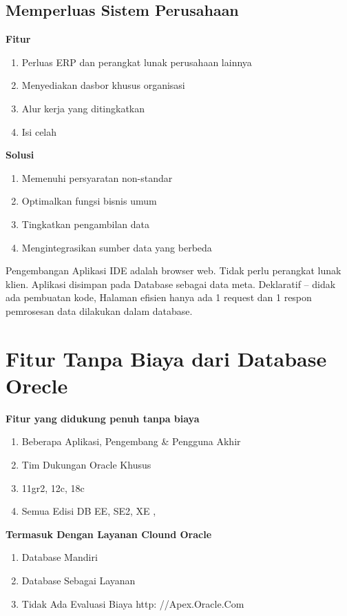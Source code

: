 \documentclass{article}
\begin{document}
\subsection{Memperluas Sistem Perusahaan}
\textbf{Fitur}
\begin{enumerate}
    \item  Perluas ERP dan perangkat lunak perusahaan lainnya
    \item Menyediakan dasbor khusus organisasi
    \item Alur kerja yang ditingkatkan
    \item Isi celah
\end{enumerate}
\textbf{Solusi}
\begin{enumerate}
    \item Memenuhi persyaratan non-standar
    \item Optimalkan fungsi bisnis umum
    \item Tingkatkan pengambilan data
    \item Mengintegrasikan sumber data yang berbeda
\end{enumerate}

	Pengembangan Aplikasi  IDE adalah browser web. Tidak perlu perangkat lunak klien. Aplikasi disimpan pada Database sebagai data meta. Deklaratif – didak ada pembuatan kode, Halaman efisien hanya ada 1 request dan  1 respon pemrosesan data dilakukan dalam database.


\section{Fitur Tanpa Biaya dari Database Orecle}
\textbf{Fitur yang didukung penuh tanpa biaya}
\begin{enumerate}
    \item Beberapa Aplikasi, Pengembang & Pengguna Akhir
\item Tim Dukungan Oracle Khusus
\item 11gr2, 12c, 18c
\item Semua Edisi DB EE, SE2, XE , 
\end{enumerate}


\textbf{Termasuk Dengan Layanan Clound Oracle}
\begin{enumerate}
    \item Database Mandiri 
\item Database Sebagai Layanan
\item Tidak Ada Evaluasi Biaya http: //Apex.Oracle.Com
\end{enumerate}
\end{document}
